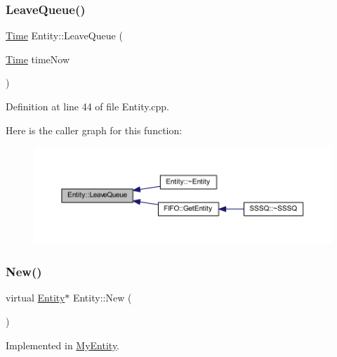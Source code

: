 \subsubsection{\texorpdfstring{Leave\+Queue()}{LeaveQueue()}}
{\footnotesize\ttfamily \hyperlink{_simulation_executive_8h_ac2d3e0ba793497bcca555c7c2cf64ff3}{Time} Entity\+::\+Leave\+Queue (\begin{DoxyParamCaption}\item[{\hyperlink{_simulation_executive_8h_ac2d3e0ba793497bcca555c7c2cf64ff3}{Time}}]{time\+Now }\end{DoxyParamCaption})}



Definition at line 44 of file Entity.\+cpp.

Here is the caller graph for this function\+:
\nopagebreak
\begin{figure}[H]
\begin{center}
\leavevmode
\includegraphics[width=350pt]{class_entity_ae05b43362e61b48a4a2ec5f629730029_icgraph}
\end{center}
\end{figure}
\mbox{\label{class_entity_ab8dc894a31d5c72219fa070345d7c383}} 
\subsubsection{\texorpdfstring{New()}{New()}}
{\footnotesize\ttfamily virtual \hyperlink{class_entity}{Entity}$\ast$ Entity\+::\+New (\begin{DoxyParamCaption}{ }\end{DoxyParamCaption})\hspace{0.3cm}{\ttfamily [pure virtual]}}



Implemented in \hyperlink{class_my_entity_acc29e753a0df1928eb4c9e627d65a3b3}{My\+Entity}.

